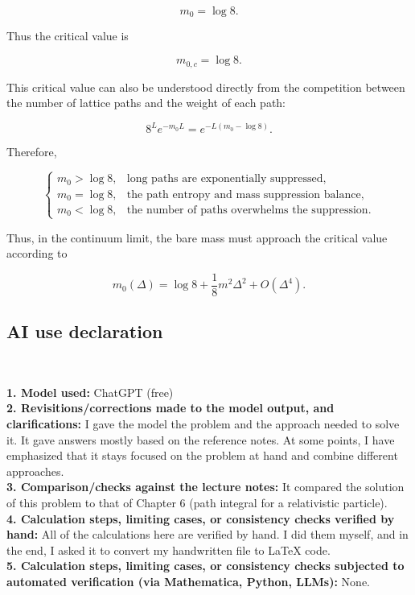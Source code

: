 \documentclass[12pt]{article}
\begin{document}
\[
m_0=\log8.
\]

Thus the critical value is

\[
\boxed{
m_{0,c}=\log8.
}
\]

This critical value can also be understood directly from the competition between the number of lattice paths and the weight of each path:

\[
8^Le^{-m_0L}
=
e^{-L(m_0-\log8)}.
\]

Therefore,

\[
\begin{cases}
m_0>\log8,
&
\text{long paths are exponentially suppressed},\\[6pt]
m_0=\log8,
&
\text{the path entropy and mass suppression balance},\\[6pt]
m_0<\log8,
&
\text{the number of paths overwhelms the suppression}.
\end{cases}
\]

Thus, in the continuum limit, the bare mass must approach the critical value according to

\[
m_0(\Delta)
=
\log8
+
\frac18m^2\Delta^2
+
O(\Delta^4).
\]

\newpage

\subsection{AI use declaration}
\

\textbf{1. Model used:} ChatGPT (free) \\

\textbf{2. Revisitions/corrections made to the model output, and clarifications:}
I gave the model the problem and the approach needed to solve it. It gave answers mostly based on the reference notes. At some points, I have emphasized that it stays focused on the problem at hand and combine different approaches.\\

\textbf{3. Comparison/checks against the lecture notes:}
It compared the solution of this problem to that of Chapter 6 (path integral for a relativistic particle). \\

\textbf{4. Calculation steps, limiting cases, or consistency checks verified by hand:} All of the calculations here are verified by hand. I did them myself, and in the end, I asked it to convert my handwritten file to LaTeX code.\\

\textbf{5. Calculation steps, limiting cases, or consistency checks subjected to automated verification (via Mathematica, Python, LLMs):}
None.
\end{document}
